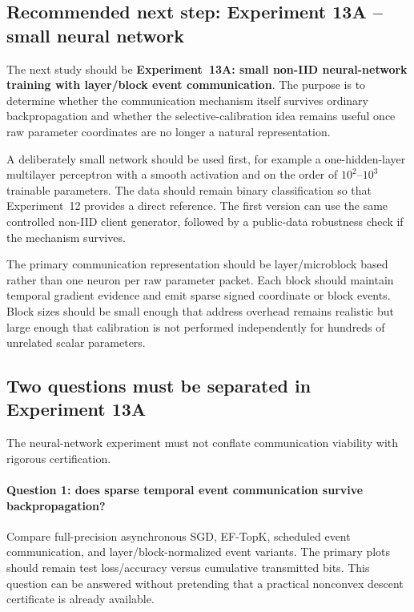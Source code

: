 \subsection{Recommended next step: Experiment 13A -- small neural network}

The next study should be \textbf{Experiment~13A: small non-IID neural-network training with layer/block event communication}. The purpose is to determine whether the communication mechanism itself survives ordinary backpropagation and whether the selective-calibration idea remains useful once raw parameter coordinates are no longer a natural representation.

A deliberately small network should be used first, for example a one-hidden-layer multilayer perceptron with a smooth activation and on the order of $10^2$--$10^3$ trainable parameters. The data should remain binary classification so that Experiment~12 provides a direct reference. The first version can use the same controlled non-IID client generator, followed by a public-data robustness check if the mechanism survives.

The primary communication representation should be layer/microblock based rather than one neuron per raw parameter packet. Each block should maintain temporal gradient evidence and emit sparse signed coordinate or block events. Block sizes should be small enough that address overhead remains realistic but large enough that calibration is not performed independently for hundreds of unrelated scalar parameters.

\subsection{Two questions must be separated in Experiment 13A}

The neural-network experiment must not conflate communication viability with rigorous certification.

\paragraph{Question 1: does sparse temporal event communication survive backpropagation?}
Compare full-precision asynchronous SGD, EF-TopK, scheduled event communication, and layer/block-normalized event variants. The primary plots should remain test loss/accuracy versus cumulative transmitted bits. This question can be answered without pretending that a practical nonconvex descent certificate is already available.

